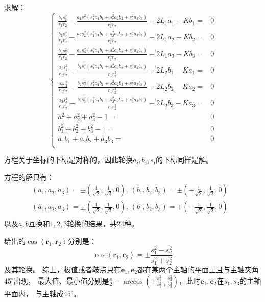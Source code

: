 \documentclass[UTF8,zihao=5]{ctexart}
\newcommand{\bm}[1]{{\mathbf{#1}}}
\begin{document}
求解：
\begin{equation}
    \left\{
        \begin{aligned}
            \frac{b_1s_1^2}{r_1r_2} -
            \frac{a_1s_1^2(s_1^2a_1b_1 + s_2^2a_2b_2 + s_3^2a_3b_3)}{r_1^3r_2} - 2L_1a_1 - Kb_1 = & 0\\
            \frac{b_2s_2^2}{r_1r_2} -
            \frac{a_2s_2^2(s_1^2a_1b_1 + s_2^2a_2b_2 + s_3^2a_3b_3)}{r_1^3r_2} - 2L_1a_2 - Kb_2 = & 0\\
            \frac{b_3s_3^2}{r_1r_2} -
            \frac{a_3s_3^2(s_1^2a_1b_1 + s_2^2a_2b_2 + s_3^2a_3b_3)}{r_1^3r_2} - 2L_1a_3 - Kb_3 = & 0\\
            \frac{a_1s_1^2}{r_1r_2} -
            \frac{b_1s_1^2(s_1^2a_1b_1 + s_2^2a_2b_2 + s_3^2a_3b_3)}{r_1r_2^3} - 2L_2b_1 - Ka_1 = & 0\\
            \frac{a_2s_2^2}{r_1r_2} -
            \frac{b_2s_2^2(s_1^2a_1b_1 + s_2^2a_2b_2 + s_3^2a_3b_3)}{r_1r_2^3} - 2L_2b_2 - Ka_2 = & 0\\
            \frac{a_3s_3^2}{r_1r_2} -
            \frac{b_3s_3^2(s_1^2a_1b_1 + s_2^2a_2b_2 + s_3^2a_3b_3)}{r_1r_2^3} - 2L_2b_3 - Ka_3 = & 0\\
            a_1^2+a_2^2+a_3^2-1 = & 0 \\
            b_1^2+b_2^2+b_3^2-1 = & 0\\
            a_1b_1 + a_2b_2 + a_3b_3 = & 0\\
        \end{aligned}
    \right.
\end{equation}

方程关于坐标的下标是对称的，因此轮换$a_i,b_i,s_i$的下标同样是解。

方程的解只有：
$$
\begin{aligned}
    (a_1,a_2,a_3)=\pm(\frac{1}{\sqrt{2}},\frac{1}{\sqrt{2}}, 0),\ (b_1,b_2,b_3)=\pm(-\frac{1}{\sqrt{2}},\frac{1}{\sqrt{2}}, 0) & \\
    (a_1,a_2,a_3)=\pm(\frac{1}{\sqrt{2}},\frac{1}{\sqrt{2}}, 0),\ (b_1,b_2,b_3)=\mp(-\frac{1}{\sqrt{2}},\frac{1}{\sqrt{2}}, 0) & \\
\end{aligned}
$$
以及$a,b$互换和$1,2,3$轮换的结果，共24种。

给出的$\cos{\left\langle \bm{r}_1,\bm{r}_2 \right\rangle}$分别是：
$$
\cos{\left\langle \bm{r}_1,\bm{r}_2 \right\rangle} = \pm\frac{s_1^2-s_2^2}{s_1^2+s_2^2}
$$
及其轮换。
综上，极值或者鞍点只在$\bm{e}_1,\bm{e}_2$都在某两个主轴的平面上且与主轴夹角$45^\circ$出现，
最大值、最小值分别是$\frac{\pi}{2} - \arccos{(\pm\frac{s_1^2-s_3^2}{s_1^2+s_3^2})}$，此时$\bm{e}_1, \bm{e}_2$在$s_1,s_3$的主轴平面内，
与主轴成$45^\circ$。
\end{document}
